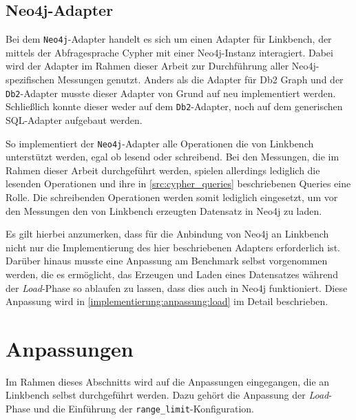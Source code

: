 \subsection{Neo4j-Adapter}
\label{implementierung:adapter:neo4j}
Bei dem \texttt{Neo4j}-Adapter handelt es sich um einen Adapter für Linkbench, der mittels der Abfragesprache Cypher mit einer Neo4j-Instanz interagiert. Dabei wird der Adapter im Rahmen dieser Arbeit zur Durchführung aller Neo4j-spezifischen Messungen genutzt. Anders als die Adapter für Db2 Graph und der \texttt{Db2}-Adapter musste dieser Adapter von Grund auf neu implementiert werden. Schließlich konnte dieser weder auf dem \texttt{Db2}-Adapter, noch auf dem generischen SQL-Adapter aufgebaut werden.

So implementiert der \texttt{Neo4j}-Adapter alle Operationen die von Linkbench unterstützt werden, egal ob lesend oder schreibend. Bei den Messungen, die im Rahmen dieser Arbeit durchgeführt werden, spielen allerdings lediglich die lesenden Operationen und ihre in \autoref{src:cypher_queries} beschriebenen Queries eine Rolle. Die schreibenden Operationen werden somit lediglich eingesetzt, um vor den Messungen den von Linkbench erzeugten Datensatz in Neo4j zu laden.

Es gilt hierbei anzumerken, dass für die Anbindung von Neo4j an Linkbench nicht nur die Implementierung des hier beschriebenen Adapters erforderlich ist. Darüber hinaus musste eine Anpassung am Benchmark selbst vorgenommen werden, die es ermöglicht, das Erzeugen und Laden eines Datensatzes während der \textit{Load}-Phase so ablaufen zu lassen, dass dies auch in Neo4j funktioniert. Diese Anpassung wird in \autoref{implementierung:anpassung:load} im Detail beschrieben.

\section{Anpassungen}
\label{implementierung:anpassung}
Im Rahmen dieses Abschnitts wird auf die Anpassungen eingegangen, die an Linkbench selbst durchgeführt werden. Dazu gehört die Anpassung der \textit{Load}-Phase und die Einführung der \texttt{range\_limit}-Konfiguration.

